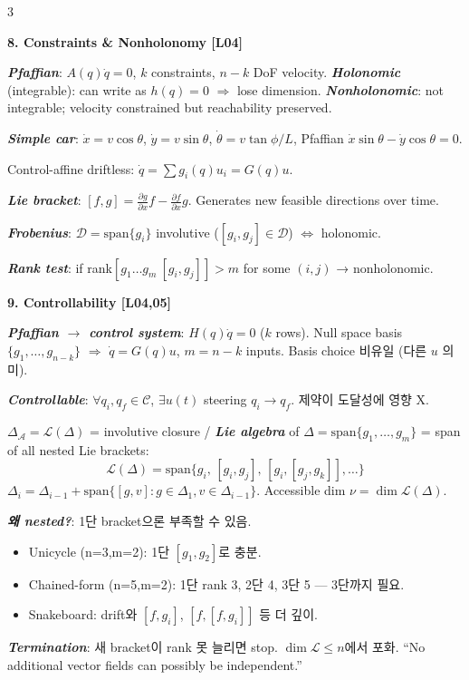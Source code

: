 \documentclass[8pt,a4paper,landscape]{extarticle}
\newcommand{\sect}[1]{\vspace{1pt}\colorbox{black!10}{\parbox{\linewidth}{\textbf{\footnotesize #1}}}\vspace{1pt}}
\newcommand{\sub}[1]{\textbf{\textit{#1}}}
\begin{document}
\begin{multicols*}{3}
\sect{8. Constraints \& Nonholonomy \hfill {\scriptsize[L04]}}
\sub{Pfaffian}: $A(q)\dot q=0$, $k$ constraints, $n-k$ DoF velocity.
\sub{Holonomic} (integrable): can write as $h(q)=0$ $\Rightarrow$ lose dimension. \sub{Nonholonomic}: not integrable; velocity constrained but reachability preserved.

\sub{Simple car}: $\dot x=v\cos\theta$, $\dot y=v\sin\theta$, $\dot\theta=v\tan\phi/L$, Pfaffian $\dot x\sin\theta-\dot y\cos\theta=0$.

Control-affine driftless: $\dot q=\sum g_i(q)u_i = G(q)u$.

\sub{Lie bracket}: $[f,g]=\tfrac{\partial g}{\partial x}f-\tfrac{\partial f}{\partial x}g$. Generates new feasible directions over time.

\sub{Frobenius}: $\mathcal{D}=\text{span}\{g_i\}$ involutive ($[g_i,g_j]\in\mathcal{D}$) $\iff$ holonomic.

\sub{Rank test}: if rank$[g_1\dots g_m\ [g_i,g_j]]>m$ for some $(i,j)$ → nonholonomic.

\sect{9. Controllability \hfill {\scriptsize[L04,05]}}
\sub{Pfaffian $\to$ control system}: $H(q)\dot q=0$ ($k$ rows). Null space basis $\{g_1,\dots,g_{n-k}\}$ $\Rightarrow$ $\dot q=G(q)u$, $m=n-k$ inputs. Basis choice 비유일 (다른 $u$ 의미).

\sub{Controllable}: $\forall q_i,q_f\in\mathcal C$, $\exists u(t)$ steering $q_i\to q_f$. 제약이 도달성에 영향 X.

$\Delta_{\mathcal A}=\mathcal L(\Delta)$ = involutive closure / \sub{Lie algebra} of $\Delta=\text{span}\{g_1,\dots,g_m\}$ = span of all nested Lie brackets:
$$\mathcal L(\Delta)=\text{span}\{g_i,\,[g_i,g_j],\,[g_i,[g_j,g_k]],\dots\}$$
$\Delta_i=\Delta_{i-1}+\text{span}\{[g,v]:g\in\Delta_1,v\in\Delta_{i-1}\}$. Accessible dim $\nu=\dim\mathcal L(\Delta)$.

\sub{왜 nested?}: 1단 bracket으론 부족할 수 있음.
\begin{itemize}
\item Unicycle (n=3,m=2): 1단 $[g_1,g_2]$로 충분.
\item Chained-form (n=5,m=2): 1단 rank 3, 2단 4, 3단 5 — 3단까지 필요.
\item Snakeboard: drift와 $[f,g_i]$, $[f,[f,g_i]]$ 등 더 깊이.
\end{itemize}

\sub{Termination}: 새 bracket이 rank 못 늘리면 stop. $\dim\mathcal L\le n$에서 포화. ``No additional vector fields can possibly be independent.''


\end{multicols*}
\end{document}
